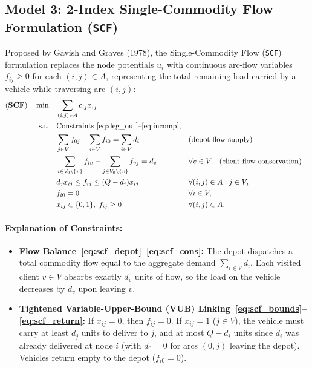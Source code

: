\documentclass[11pt,a4paper]{article}
\begin{document}
\subsection{Model 3: 2-Index Single-Commodity Flow Formulation (\texttt{SCF})}
Proposed by Gavish and Graves (1978), the Single-Commodity Flow (\texttt{SCF}) formulation replaces the node potentials $u_i$ with continuous arc-flow variables $f_{ij} \ge 0$ for each $(i, j) \in A$, representing the total remaining load carried by a vehicle while traversing arc $(i, j)$:
\begin{align}
\text{(\textbf{SCF})} \quad \min \quad & \sum_{(i,j) \in A} c_{ij} x_{ij} \nonumber \\
\text{s.t.} \quad & \text{Constraints~\eqref{eq:deg_out}--\eqref{eq:incomp}}, \nonumber \\
& \sum_{j \in V} f_{0j} - \sum_{i \in V} f_{i0} = \sum_{i \in V} d_i && \text{(depot flow supply)} \label{eq:scf_depot} \\
& \sum_{i \in V_0 \setminus \{v\}} f_{iv} - \sum_{j \in V_0 \setminus \{v\}} f_{vj} = d_v && \forall v \in V \quad \text{(client flow conservation)} \label{eq:scf_cons} \\
& d_j x_{ij} \le f_{ij} \le (Q - d_i) x_{ij} && \forall (i, j) \in A : j \in V, \label{eq:scf_bounds} \\
& f_{i0} = 0 && \forall i \in V, \label{eq:scf_return} \\
& x_{ij} \in \{0, 1\}, \; f_{ij} \ge 0 && \forall (i, j) \in A. \nonumber
\end{align}
\paragraph{Explanation of Constraints:}
\begin{itemize}[noitemsep,topsep=2pt]
    \item \textbf{Flow Balance~\eqref{eq:scf_depot}--\eqref{eq:scf_cons}:} The depot dispatches a total commodity flow equal to the aggregate demand $\sum_{i \in V} d_i$. Each visited client $v \in V$ absorbs exactly $d_v$ units of flow, so the load on the vehicle decreases by $d_v$ upon leaving $v$.
    \item \textbf{Tightened Variable-Upper-Bound (VUB) Linking~\eqref{eq:scf_bounds}--\eqref{eq:scf_return}:} If $x_{ij} = 0$, then $f_{ij} = 0$. If $x_{ij} = 1$ ($j \in V$), the vehicle must carry at least $d_j$ units to deliver to $j$, and at most $Q - d_i$ units since $d_i$ was already delivered at node $i$ (with $d_0 = 0$ for arcs $(0, j)$ leaving the depot). Vehicles return empty to the depot ($f_{i0} = 0$).
\end{itemize}
\end{document}

